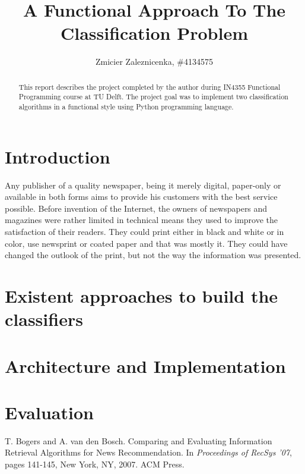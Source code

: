 \documentclass{llncs}
\begin{document}
\title{A Functional Approach To The Classification Problem}
\author{Zmicier Zaleznicenka, \#4134575}

\maketitle


\begin{abstract}
This report describes the project completed by the author during IN4355 Functional Programming course at TU Delft. The project goal was to implement two classification algorithms in a functional style using Python programming language.
\end{abstract}

\section{Introduction}

Any publisher of a quality newspaper, being it merely digital, paper-only or available in both forms aims to provide his customers with the best service possible. Before invention of the Internet, the owners of newspapers and magazines were rather limited in technical means they used to improve the satisfaction of their readers. They could print either in black and white or in color, use newsprint or coated paper and that was mostly it. They could have changed the outlook of the print, but not the way the information was presented. 

\section{Existent approaches to build the classifiers}


\section{Architecture and Implementation}


\section{Evaluation}



\begin{thebibliography}{99}
 T. Bogers and A. van den Bosch. Comparing and Evaluating Information Retrieval Algorithms for News Recommendation. In \emph{Proceedings of RecSys '07}, pages 141-145, New York, NY, 2007. ACM Press.  
\end{thebibliography}
\end{document}
